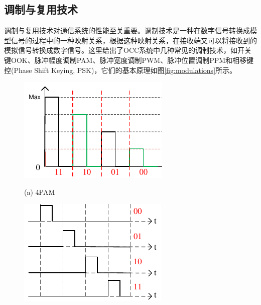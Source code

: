 \subsection{调制与复用技术}
调制与复用技术对通信系统的性能至关重要。调制技术是一种在数字信号转换成模型信号的过程中的一种映射关系，根据这种映射关系，在接收端又可以将接收到的模拟信号转换成数字信号。这里给出了OCC系统中几种常见的调制技术，如开关键OOK、脉冲幅度调制PAM、脉冲宽度调制PWM、脉冲位置调制PPM和相移键控(Phase Shift Keying, PSK)，它们的基本原理如图\ref{fig:modulations}所示。
\begin{figure}[!t]
\centering
  \begin{minipage}{0.45\linewidth}
    \centerline{\includegraphics[width=\textwidth]{FIG/4PAM.pdf}}
    \centerline{(a) 4PAM}
  \end{minipage}
  \begin{minipage}{0.45\linewidth}
    \centerline{\includegraphics[width=\textwidth]{FIG/4PPM.pdf}}

\end{minipage}
\end{figure}
